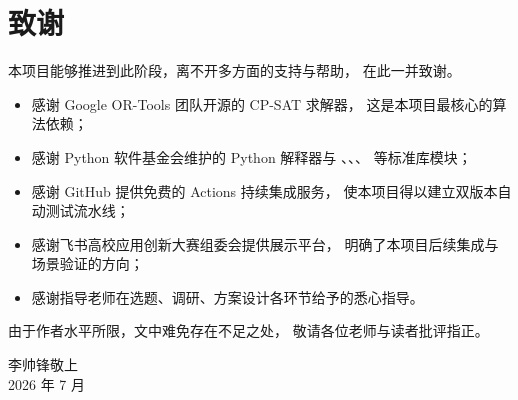 \clearpage
\section*{致\quad 谢}

本项目能够推进到此阶段，离不开多方面的支持与帮助，
在此一并致谢。

\begin{itemize}[leftmargin=2em,itemsep=0.2em]
  \item 感谢 Google OR-Tools 团队开源的 CP-SAT 求解器，
        这是本项目最核心的算法依赖；
  \item 感谢 Python 软件基金会维护的 Python 解释器与
        、、、
         等标准库模块；
  \item 感谢 GitHub 提供免费的 Actions 持续集成服务，
        使本项目得以建立双版本自动测试流水线；
  \item 感谢飞书高校应用创新大赛组委会提供展示平台，
        明确了本项目后续集成与场景验证的方向；
  \item 感谢指导老师在选题、调研、方案设计各环节给予的悉心指导。
\end{itemize}

由于作者水平所限，文中难免存在不足之处，
敬请各位老师与读者批评指正。

\vspace{1em}
\begin{flushright}
  李帅锋\quad 敬上\\
  2026 年 7 月
\end{flushright}
